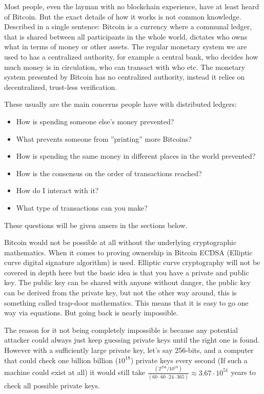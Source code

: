 Most people, even the layman with no blockchain experience, have at least heard
of Bitcoin. But the exact details of how it works is not common knowledge.
Described in a single sentence: Bitcoin is a currency where a communal ledger,
that is shared between all participants in the whole world, dictates who owns what in terms of money or other assets. 
The regular monetary system we are
used to has a centralized authority, for example a central bank, who decides
how much money is in circulation, who can transact with who etc. The monetary
system presented by Bitcoin has no centralized authority, instead it relies on
decentralized, trust-less verification.

These usually are the main concerns people have with distributed ledgers:
\begin{itemize}
	\item How is spending someone else's money prevented?
	\item What prevents someone from ''printing'' more Bitcoins?
	\item How is spending the same money in different places in the world prevented?
	\item How is the consensus on the order of transactions reached?
	\item How do I interact with it?
	\item What type of transactions can you make?
\end{itemize}

These questions will be given ansers in the sections below.

Bitcoin would not be possible at all without the underlying cryptographic
mathematics. When it comes to proving ownership in Bitcoin ECDSA (Elliptic curve
digital signature algorithm)\cite{ecc_def} is used. Elliptic curve cryptography
will not be covered in depth here but the basic idea is that you have a private
and public key. The public key can be shared with anyone without danger, the
public key can be derived from the private key, but not the other way around,
this is something called trap-door mathematics.\cite{ecc_def}\cite{antonopoulos_2017}
This means that it is easy to go one way via equations. But going back is
nearly impossible.

The reason for it not being completely impossible is because any potential
attacker could always just keep guessing private keys until the right one is
found. However with a sufficiently large private key, let's say 256-bits, and a
computer that could check one billion billion ($10^{18}$) private keys every
second (If such a machine could exist at all) it would still take
$\frac{(2^{256} / 10^{18})}{(60\cdot60\cdot24\cdot365)}\approx3.67\cdot10^{51}$
years to check all possible private keys.

